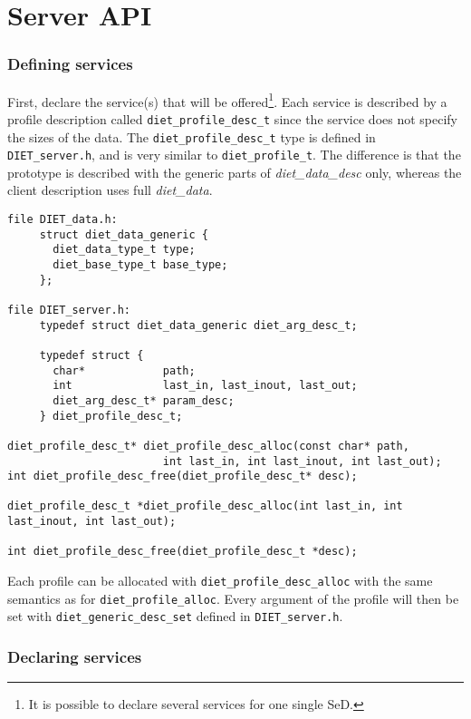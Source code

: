 \section{Server API}
\label{sec:svAPI}


\subsubsection*{Defining services}

First, declare the service(s) that will be offered{\footnote{It is
possible to declare several services for one single SeD.}}.
Each service is described by a profile description called
\texttt{diet\_profile\_desc\_t} since the service does not specify
the sizes of the data. The \texttt{diet\_profile\_desc\_t} type is
defined in \texttt{DIET\_server.h}, and is very similar to
\texttt{diet\_profile\_t}. The difference is that the prototype is
described with the generic parts of \emph{diet\_data\_desc} only,
whereas the client description uses full \emph{diet\_data}.
{\footnotesize
\begin{verbatim}
file DIET_data.h:
     struct diet_data_generic {
       diet_data_type_t type;
       diet_base_type_t base_type;
     };

file DIET_server.h:
     typedef struct diet_data_generic diet_arg_desc_t;

     typedef struct {
       char*            path;
       int              last_in, last_inout, last_out;
       diet_arg_desc_t* param_desc;
     } diet_profile_desc_t;

diet_profile_desc_t* diet_profile_desc_alloc(const char* path,
                        int last_in, int last_inout, int last_out);
int diet_profile_desc_free(diet_profile_desc_t* desc);

diet_profile_desc_t *diet_profile_desc_alloc(int last_in, int last_inout, int last_out);

int diet_profile_desc_free(diet_profile_desc_t *desc);
\end{verbatim}
}

Each profile can be allocated with \texttt{diet\_profile\_desc\_alloc} with the
same semantics as for \texttt{diet\_profile\_alloc}. Every argument of the
profile will then be set with \texttt{diet\_generic\_desc\_set} defined in
\texttt{DIET\_server.h}.

\subsubsection*{Declaring services}

